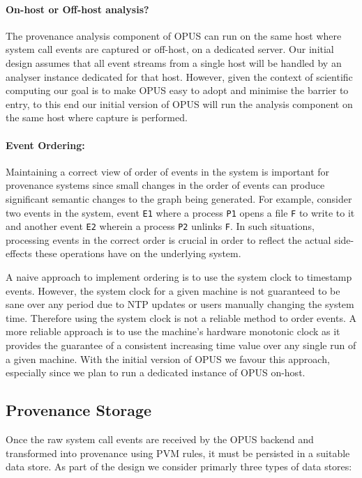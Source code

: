 \documentclass[withindex,glossary]{cam-thesis}
\begin{document}
\paragraph{On-host or Off-host analysis?}
The provenance analysis component of OPUS can run on the same host where system call events are captured or off-host, on a dedicated server.
Our initial design assumes that all event streams from a single host will be handled by an analyser instance dedicated for that host.
However, given the context of scientific computing our goal is to make OPUS easy to adopt and minimise the barrier to entry, to this end our initial version of OPUS will run the analysis component on the same host where capture is performed.

\paragraph{Event Ordering:}
Maintaining a correct view of order of events in the system is important for provenance systems since small changes in the order of events can produce significant semantic changes to the graph being generated.
For example, consider two events in the system, event \texttt{E1} where a process \texttt{P1} opens a file \texttt{F} to write to it and another event \texttt{E2} wherein a process \texttt{P2} unlinks \texttt{F}.
In such situations, processing events in the correct order is crucial in order to reflect the actual side-effects these operations have on the underlying system.

A naive approach to implement ordering is to use the system clock to timestamp events.
However, the system clock for a given machine is not guaranteed to be sane over any period due to NTP updates or users manually changing the system time.
Therefore using the system clock is not a reliable method to order events.
A more reliable approach is to use the machine's hardware monotonic clock as it provides the guarantee of a consistent increasing time value over any single run of a given machine.
With the initial version of OPUS we favour this approach, especially since we plan to run a dedicated instance of OPUS on-host.

\subsection{Provenance Storage}
Once the raw system call events are received by the OPUS backend and transformed into provenance using PVM rules, it must be persisted in a suitable data store.
As part of the design we consider primarly three types of data stores:
\end{document}
